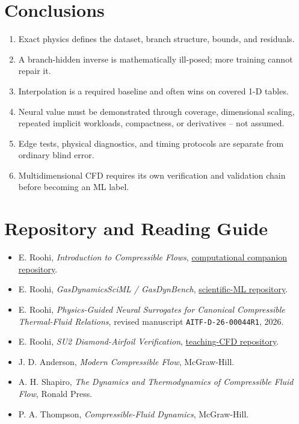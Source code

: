 \documentclass[11pt]{article}
\begin{document}
\section{Conclusions}
\begin{enumerate}
\item Exact physics defines the dataset, branch structure, bounds, and residuals.
\item A branch-hidden inverse is mathematically ill-posed; more training cannot repair it.
\item Interpolation is a required baseline and often wins on covered 1-D tables.
\item Neural value must be demonstrated through coverage, dimensional scaling,
repeated implicit workloads, compactness, or derivatives -- not assumed.
\item Edge tests, physical diagnostics, and timing protocols are separate from ordinary blind error.
\item Multidimensional CFD requires its own verification and validation chain before becoming an ML label.
\end{enumerate}

\section*{Repository and Reading Guide}
\begin{itemize}
\item E. Roohi, \emph{Introduction to Compressible Flows},
\href{https://github.com/Ehsan-Roohi/Introduction-to-Compressible-Flows}{computational companion repository}.
\item E. Roohi, \emph{GasDynamicsSciML / GasDynBench},
\href{https://github.com/Ehsan-Roohi/GasDynamicsSciML}{scientific-ML repository}.
\item E. Roohi, \emph{Physics-Guided Neural Surrogates for Canonical Compressible
Thermal-Fluid Relations}, revised manuscript \texttt{AITF-D-26-00044R1}, 2026.
\item E. Roohi, \emph{SU2 Diamond-Airfoil Verification},
\href{https://github.com/Ehsan-Roohi/SU2-Diamond-Airfoil-Verification}{teaching-CFD repository}.
\item J. D. Anderson, \emph{Modern Compressible Flow}, McGraw-Hill.
\item A. H. Shapiro, \emph{The Dynamics and Thermodynamics of Compressible Fluid Flow}, Ronald Press.
\item P. A. Thompson, \emph{Compressible-Fluid Dynamics}, McGraw-Hill.
\end{itemize}
\end{document}
